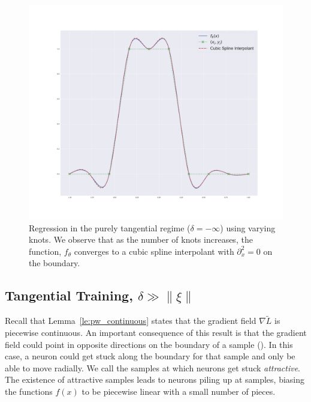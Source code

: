 \begin{figure}
    \endminipage\hfill
    \includegraphics[width=\linewidth]{figures/cubic_spline_10k.pdf}
    \endminipage
    \caption{Regression in the purely tangential regime ($\delta = -\infty$) using varying knots. We observe that as the number of knots increases, the function, $f_\theta$ converges to a cubic spline interpolant with $\partial_x^2 = 0$ on the boundary.}
    \label{fig:radial_trajectores}
\end{figure}



















\subsection{Tangential Training, $\delta \gg \|\xi\|$}



Recall that Lemma~\ref{le:pw_continuous} states that the gradient field $\nabla \tilde{L}$ is piecewise continuous. An important consequence of this result is that the gradient field could point in opposite directions on the boundary of a sample (). In this case, a neuron could get stuck along the boundary for that sample and only be able to move radially. We call the samples at which neurons get stuck \emph{attractive}. The existence of attractive samples leads to neurons piling up at samples, biasing the functions $f(x)$ to be piecewise linear with a small number of pieces.

